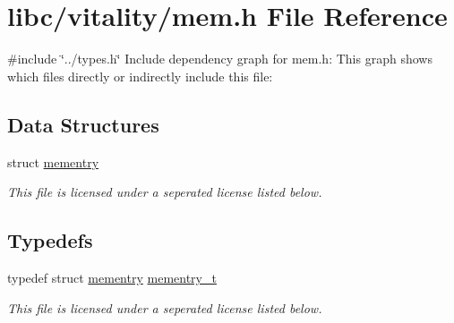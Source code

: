 \hypertarget{a00119}{}\section{libc/vitality/mem.h File Reference}
\label{a00119}
{\ttfamily \#include \char`\"{}../types.\+h\char`\"{}}\newline
Include dependency graph for mem.\+h\+:
This graph shows which files directly or indirectly include this file\+:
\subsection*{Data Structures}
\begin{DoxyCompactItemize}
\item 
struct \hyperlink{a00179}{mementry}
\begin{DoxyCompactList}\small\item\em This file is licensed under a seperated license listed below. \end{DoxyCompactList}\end{DoxyCompactItemize}
\subsection*{Typedefs}
\begin{DoxyCompactItemize}
\item 
typedef struct \hyperlink{a00179}{mementry} \hyperlink{a00119_a876b6ee19692762a87e4673911f9b8da_a876b6ee19692762a87e4673911f9b8da}{mementry\+\_\+t}
\begin{DoxyCompactList}\small\item\em This file is licensed under a seperated license listed below. \end{DoxyCompactList}\end{DoxyCompactItemize}
